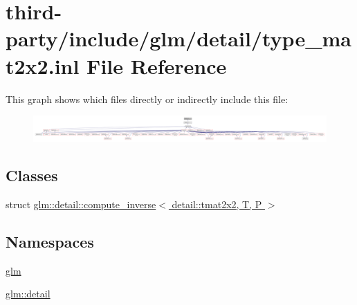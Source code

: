 \hypertarget{type__mat2x2_8inl}{}\section{third-\/party/include/glm/detail/type\+\_\+mat2x2.inl File Reference}
\label{type__mat2x2_8inl}
This graph shows which files directly or indirectly include this file\+:
\nopagebreak
\begin{figure}[H]
\begin{center}
\leavevmode
\includegraphics[width=350pt]{type__mat2x2_8inl__dep__incl}
\end{center}
\end{figure}
\subsection*{Classes}
\begin{DoxyCompactItemize}
\item 
struct \hyperlink{structglm_1_1detail_1_1compute__inverse_3_01detail_1_1tmat2x2_00_01_t_00_01_p_01_4}{glm\+::detail\+::compute\+\_\+inverse$<$ detail\+::tmat2x2, T, P $>$}
\end{DoxyCompactItemize}
\subsection*{Namespaces}
\begin{DoxyCompactItemize}
\item 
 \hyperlink{namespaceglm}{glm}
\item 
 \hyperlink{namespaceglm_1_1detail}{glm\+::detail}
\end{DoxyCompactItemize}
